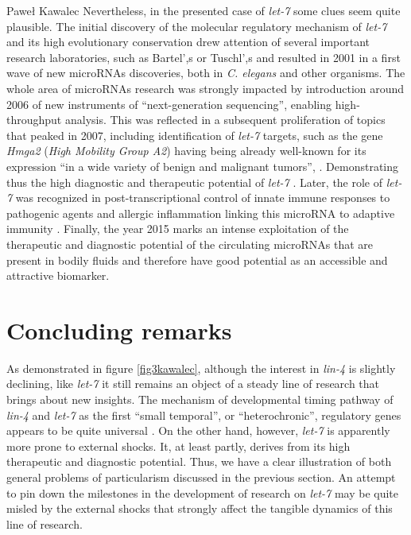 \begin{artengenv}{Paweł Kawalec}
Nevertheless, in the presented case of \textit{let-7} some clues seem quite plausible. The initial discovery of the molecular regulatory mechanism of \textit{let-7} and its high evolutionary conservation
\parencite[][]{nelson_trans-splicing_2019} %
 drew attention of several important research laboratories, such as Bartel',s or Tuschl',s and resulted in 2001 in a first wave of new microRNAs discoveries, both in \textit{C. elegans} and other organisms. The whole area of microRNAs research was strongly impacted by introduction around 2006 of new instruments of ``next-generation sequencing'', enabling high-throughput analysis. This was reflected in a subsequent proliferation of topics that peaked in 2007, including identification of \textit{let-7} targets, such as the gene \textit{Hmga2} (\textit{High Mobility Group A2}) having being already well-known for its expression ``in a wide variety of benign and malignant tumors'', 
\parencite[][p.1576]{mayr_disrupting_2007}. %
 Demonstrating thus the high diagnostic and therapeutic potential of \textit{let-7} 
\parencites[][]{johnson_let-7_2007}[][]{kuehbacher_role_2007}[][]{park_let-7_2007}[][]{cinkornpumin_small_2017}[][]{pobezinsky_lets_2018}[][]{roos_pharmacologic_2018}. %
 Later, the role of \textit{let-7} was recognized in post-transcriptional control of innate immune responses to pathogenic agents and allergic inflammation linking this microRNA to adaptive immunity 
\parencites[][]{schulte_analysis_2011}[][]{kumar_let-7_2011}. %
 Finally, the year 2015 marks an intense exploitation of the therapeutic and diagnostic potential of the circulating microRNAs that are present in bodily fluids and therefore have good potential as an accessible and attractive biomarker.

\section{Concluding remarks}
As demonstrated in figure \ref{fig3kawalec}, although the interest in \textit{lin-4} is slightly declining, like \textit{let-7} it still remains an object of a steady line of research that brings about new insights. The mechanism of developmental timing pathway of \textit{lin-4} and \textit{let-7} as the first ``small temporal'', or ``heterochronic'', regulatory genes appears to be quite universal
\parencite[][]{bracht_regulation_2010}. %
 On the other hand, however, \textit{let-7} is apparently more prone to external shocks. It, at least partly, derives from its high therapeutic and diagnostic potential. Thus, we have a clear illustration of both general problems of particularism discussed in the previous section. An attempt to pin down the milestones in the development of research on \textit{let-7} may be quite misled by the external shocks that strongly affect the tangible dynamics of this line of research.


\end{artengenv}

